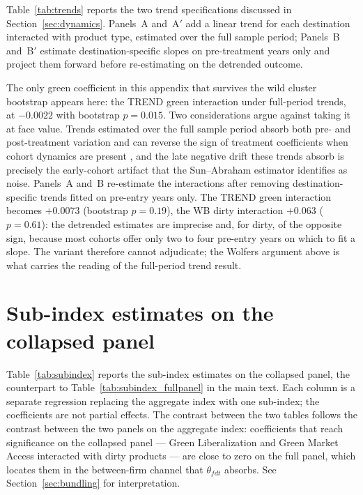 \documentclass[12pt]{article}
\begin{document}
Table~\ref{tab:trends} reports the two trend specifications discussed in
Section~\ref{sec:dynamics}. Panels~A and~A$'$ add a linear trend for each destination interacted with
product type, estimated over the full sample period; Panels~B and~B$'$ estimate destination-specific
slopes on pre-treatment years only and project them forward before re-estimating on the detrended
outcome.

The only green coefficient in this appendix that survives the wild cluster bootstrap
appears here: the TREND green interaction under full-period trends, at $-0.0022$ with bootstrap
$p = 0.015$. Two considerations argue against taking it at face value. Trends estimated over the full
sample period absorb both pre- and post-treatment variation and can reverse the sign of treatment
coefficients when cohort dynamics are present \citep{wolfers2006}, and the late negative drift these
trends absorb is precisely the early-cohort artifact that the Sun--Abraham estimator identifies as
noise. Panels~A and~B re-estimate the interactions after removing destination-specific trends fitted on
pre-entry years only. The TREND green interaction becomes $+0.0073$ (bootstrap $p = 0.19$), the WB
dirty interaction $+0.063$ ($p = 0.61$): the detrended estimates are imprecise and, for dirty, of
the opposite sign, because most cohorts offer only two to four pre-entry years on which to fit a
slope. The variant therefore cannot adjudicate; the Wolfers argument above is what carries the
reading of the full-period trend result.



\section{Sub-index estimates on the collapsed panel}\label{app:subindices}

Table~\ref{tab:subindex} reports the sub-index estimates on the collapsed panel, the counterpart to
Table~\ref{tab:subindex_fullpanel} in the main text. Each column is a separate regression replacing
the aggregate index with one sub-index; the coefficients are not partial effects. The contrast between
the two tables follows the contrast between the two panels on the aggregate index: coefficients that
reach significance on the collapsed panel --- Green Liberalization and Green Market Access interacted
with dirty products --- are close to zero on the full panel, which locates them in the between-firm
channel that $\theta_{fdt}$ absorbs. See Section~\ref{sec:bundling} for interpretation.
\end{document}
